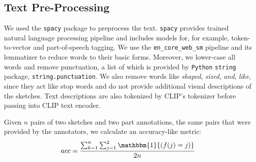 
\subsection{Text Pre-Processing}
We used the \texttt{spacy} package to preprocess the text. \texttt{spacy} provides trained natural language processing pipeline and includes models for, for example, token-to-vector and part-of-speech tagging. We use the \texttt{en\_core\_web\_sm} pipeline and its lemmatizer to reduce words to their basic forms. Moreover, we lower-case all words and remove punctuation, a list of which is provided by \texttt{Python} \texttt{string} package, \texttt{string.punctuation}. We also remove words like \textit{shaped}, \textit{sized}, \textit{and}, \textit{like}, since they act like stop words and do not provide additional visual descriptions of the sketches. Text descriptions are also tokenized by CLIP's tokenizer before passing into CLIP text encoder.     


Given $n$ pairs of two sketches and two part annotations, the same pairs that were provided by the annotators, we calculate an accuracy-like metric:
$$ acc = \frac{\sum_{k=1}^{n} \sum_{j=1}^2 \mathbbm{1}{(f(j) = j)}}{2n} $$

